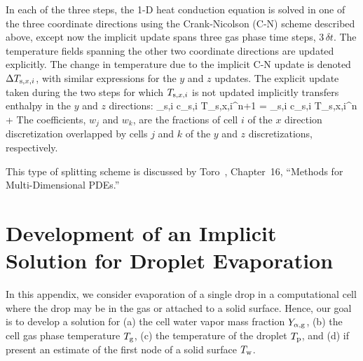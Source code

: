 In each of the three steps, the 1-D heat conduction equation is solved in one of the three coordinate directions using the Crank-Nicolson (C-N) scheme described above, except now the implicit update spans three gas phase time steps, $3\, \delta t$. The temperature fields spanning the other two coordinate directions are updated explicitly. The change in temperature due to the implicit C-N update is denoted $\Delta T_{{\rm s},x,i}$, with similar expressions for the $y$ and $z$ updates. The explicit update taken during the two steps for which $T_{{\rm s},x,i}$ is not updated implicitly transfers enthalpy in the $y$ and $z$ directions:
\be
    \rho_{{\rm s},i} c_{{\rm s},i} T_{{\rm s},x,i}^{n+1} = \rho_{{\rm s},i} c_{{\rm s},i} T_{{\rm s},x,i}^{n}  +   
\ee
The coefficients, $w_j$ and $w_k$, are the fractions of cell $i$ of the $x$ direction discretization overlapped by cells $j$ and $k$ of the $y$ and $z$ discretizations, respectively.

This type of splitting scheme is discussed by Toro~\cite{Toro}, Chapter~16, ``Methods for Multi-Dimensional PDEs.''


\chapter{Development of an Implicit Solution for Droplet Evaporation}
\label{app_drop_evaporation}

In this appendix, we consider evaporation of a single drop in a computational cell where the drop may be in the gas or attached to a solid surface.  Hence, our goal is to develop a solution for (a) the cell water vapor mass fraction $Y_{\rm \alpha, g}$, (b) the cell gas phase temperature $T_{\rm g}$, (c) the temperature of the droplet $T_{\rm p}$, and (d) if present an estimate of the first node of a solid surface $T_{\rm w}$.

